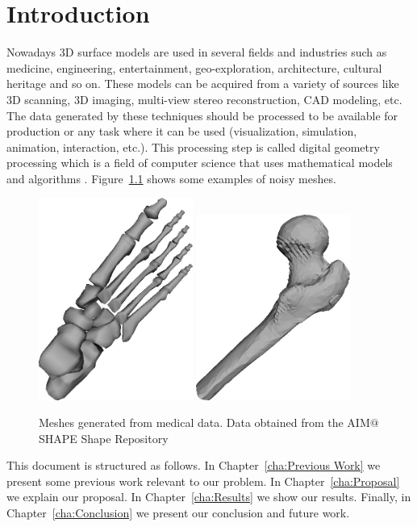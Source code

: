 
\chapter{Introduction}
Nowadays 3D surface models are used in several fields and industries such as medicine, engineering, entertainment, geo-exploration, architecture, cultural heritage and so on. These models can be acquired from a variety of sources like 3D scanning, 3D imaging, multi-view stereo reconstruction, CAD modeling, etc. The data generated by these techniques should be processed to be available for production or any task where it can be used (visualization, simulation, animation, interaction, etc.). This processing step is called digital geometry processing which is a field of computer science that uses mathematical models and algorithms \cite{BKPAL10}. Figure~\ref{fig:example} shows some examples of noisy meshes.



\begin{figure}
\centering
\includegraphics[width=0.45\textwidth]{pictures/image01.png}
\includegraphics[width=0.45\textwidth]{pictures/image02.png}
\caption{Meshes generated from medical data. Data obtained from the AIM$@$SHAPE Shape Repository \cite{AIMSHAPE}}
\label{fig:example}
\end{figure}


This document is structured as follows. In Chapter~\ref{cha:Previous Work} we present some previous work relevant to our problem. In Chapter~\ref{cha:Proposal} we explain our proposal. In Chapter~\ref{cha:Results} we show our results. Finally, in Chapter~\ref{cha:Conclusion} we present our conclusion and future work.


